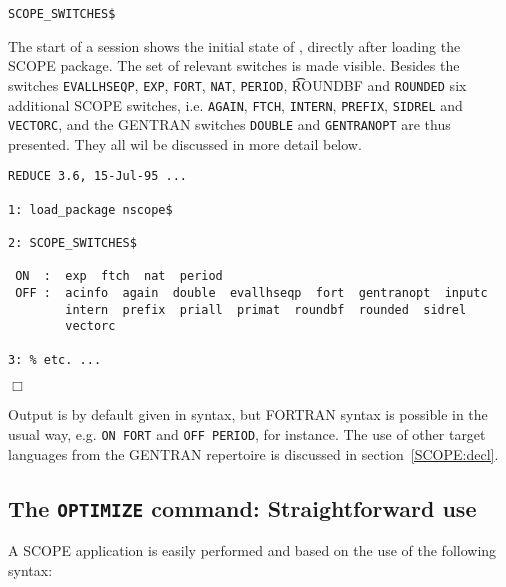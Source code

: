 \hspace*{1cm} {\tt SCOPE\_SWITCHES}\verb+$+


\example\label{ex:3.1.1}

The start of a {\REDUCE} session shows the initial state
of {\REDUCE}, directly after loading the SCOPE package. 
The set of relevant switches is made visible. 
Besides the {\REDUCE} switches {\tt EVALLHSEQP}, {\tt EXP}, {\tt FORT}, 
{\tt NAT}, {\tt PERIOD}, {\t ROUNDBF}
and {\tt ROUNDED} six additional SCOPE switches, i.e. {\tt AGAIN}, {\tt FTCH}, 
{\tt INTERN}, {\tt PREFIX}, {\tt SIDREL} and {\tt VECTORC}, and the GENTRAN
switches {\tt DOUBLE} and {\tt GENTRANOPT} are thus presented. 
They all wil be discussed in more 
detail below.

{\small
\begin{verbatim}
REDUCE 3.6, 15-Jul-95 ...

1: load_package nscope$

2: SCOPE_SWITCHES$

 ON  :  exp  ftch  nat  period  
 OFF :  acinfo  again  double  evallhseqp  fort  gentranopt  inputc  
        intern  prefix  priall  primat  roundbf  rounded  sidrel  
        vectorc  

3: % etc. ...
\end{verbatim}
\begin{flushright}
$\Box$
\end{flushright}}

Output is by default given in {\REDUCE} syntax, but FORTRAN syntax is
possible in the usual way, e.g. {\tt ON FORT} and {\tt OFF PERIOD}, for 
instance.  The use of other target languages
from the GENTRAN repertoire is discussed in section~\ref{SCOPE:decl}.

\subsection{The {\tt OPTIMIZE} command: Straightforward use}\label{SCOPE:optim}

A SCOPE application is easily performed and based on the use of 
the following syntax:

